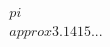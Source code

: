\documentclass[preview]{standalone}
\begin{document}
\begin{align*}
\quad\\pi \quad\\approx 3.1415...
\end{align*}
\end{document}
